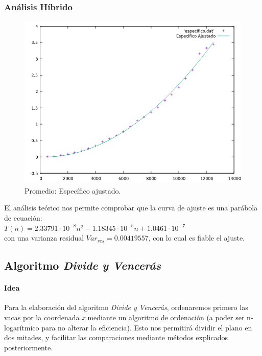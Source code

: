 \documentclass[a4paper,12pt,twoside]{article} %
\begin{document}
\newpage


\subsubsection{Análisis Híbrido}

\begin{figure}[h]
  \begin{center}
  
  	\includegraphics[scale=0.7]{especifico_ajustado.png}
  	\caption{Promedio: Específico ajustado.}
  	
  \end{center}
\end{figure}


El análisis teórico nos permite comprobar que la curva de ajuste es una parábola de ecuación:\\

$T(n) = 2.33791 \cdot{10^{-8}} n^2 -1.18345 \cdot{10^{-5}} n + 1.0461  \cdot{10^{-7}} $\\

con una varianza residual $Var_{res} =0.00419557$, con lo cual es fiable el ajuste.

\newpage

\subsection{Algoritmo \textit{Divide y Vencerás}}


\paragraph{Idea}
Para la elaboración del algoritmo \textit{Divide y Vencerás}, ordenaremos primero las vacas por la coordenada \textit{x} mediante un algoritmo de ordenación (a poder ser n-logarítmico para no alterar la eficiencia). Esto nos permitirá dividir el plano en dos mitades, y facilitar las comparaciones mediante métodos explicados posteriormente.
\end{document}
